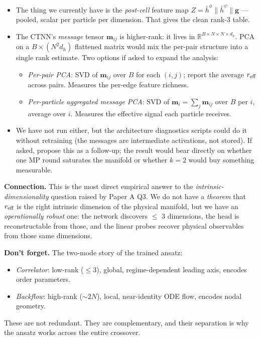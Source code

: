 \documentclass[11pt]{article}
\begin{document}
\begin{itemize}
\item The thing we currently have is the \emph{post-cell} feature map $Z = \bar
  h^\phi \| \bar h^\psi \| \mathbf g$ --- pooled, scalar per particle per
dimension. That gives the clean rank-3 table.
\item The CTNN's \emph{message} tensor $\mathbf m_{ij}$ is higher-rank: it lives in
$\mathbb R^{B \times N \times N \times d_h}$. PCA on a $B \times (N^2
  d_h)$ flattened matrix would mix the per-pair structure into a single
rank estimate. Two options if asked to expand the analysis:
\begin{itemize}
\item \emph{Per-pair PCA}: SVD of $\mathbf m_{ij}$ over $B$ for each $(i,j)$;
report the average $r_{\rm eff}$ across pairs. Measures the per-edge
feature richness.
\item \emph{Per-particle aggregated message PCA}: SVD of $\mathbf m_i = \sum_j
    \mathbf m_{ij}$ over $B$ per $i$, average over $i$. Measures the
effective signal each particle receives.
\end{itemize}
\item We have not run either, but the architecture diagnostics scripts could
do it without retraining (the messages are intermediate activations,
not stored). If asked, propose this as a follow-up; the result would
bear directly on whether one MP round saturates the manifold or whether
$k = 2$ would buy something measurable.
\end{itemize}
\textbf{Connection.} This is the most direct empirical answer to the
\emph{intrinsic-dimensionality} question raised by Paper A Q3. We do not have
a \emph{theorem} that $r_{\rm eff}$ is the right intrinsic dimension of the
physical manifold, but we have an \emph{operationally robust} one: the network
discovers $\le$ 3 dimensions, the head is reconstructable from those, and the
linear probes recover physical observables from those same dimensions.

\textbf{Don't forget.} The two-mode story of the trained ansatz:
\begin{itemize}
\item \emph{Correlator}: low-rank ($\le 3$), global, regime-dependent leading axis,
encodes order parameters.
\item \emph{Backflow}: high-rank ($\sim 2N$), local, near-identity ODE flow,
encodes nodal geometry.
\end{itemize}
These are not redundant. They are complementary, and their separation
is why the ansatz works across the entire crossover.
\end{document}
